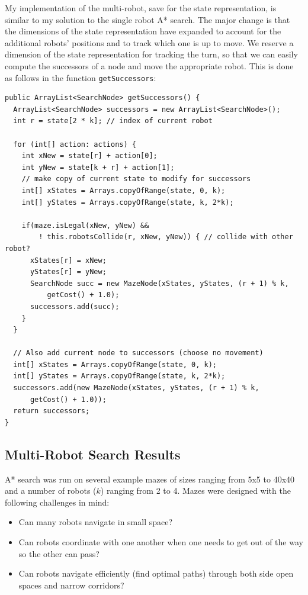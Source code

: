 \documentclass{article}
\begin{document}
My implementation of the multi-robot, save for the state representation, is similar to my solution to the single robot A* search. The major change is that the dimensions of the state representation have expanded to account for the additional robots' positions and to track which one is up to move. We reserve a dimension of the state representation for tracking the turn, so that we can easily compute the successors of a node and move the appropriate robot. This is done as follows in the function \verb`getSuccessors`:

\begin{lstlisting}
public ArrayList<SearchNode> getSuccessors() {
  ArrayList<SearchNode> successors = new ArrayList<SearchNode>();
  int r = state[2 * k]; // index of current robot
  
  for (int[] action: actions) {
    int xNew = state[r] + action[0];
    int yNew = state[k + r] + action[1];
    // make copy of current state to modify for successors
    int[] xStates = Arrays.copyOfRange(state, 0, k);
    int[] yStates = Arrays.copyOfRange(state, k, 2*k);
    
    if(maze.isLegal(xNew, yNew) && 
        ! this.robotsCollide(r, xNew, yNew)) { // collide with other robot?
      xStates[r] = xNew;
      yStates[r] = yNew;
      SearchNode succ = new MazeNode(xStates, yStates, (r + 1) % k,
          getCost() + 1.0);
      successors.add(succ);
    }  
  }
  
  // Also add current node to successors (choose no movement)
  int[] xStates = Arrays.copyOfRange(state, 0, k);
  int[] yStates = Arrays.copyOfRange(state, k, 2*k);
  successors.add(new MazeNode(xStates, yStates, (r + 1) % k, 
      getCost() + 1.0));
  return successors;
}
\end{lstlisting}

\subsection{Multi-Robot Search Results}

A* search was run on several example mazes of sizes ranging from 5x5 to 40x40 and a number of robots ($k$) ranging from 2 to 4. Mazes were designed with the following challenges in mind:

\begin{itemize}
  \item Can many robots navigate in small space?
  \item Can robots coordinate with one another when one needs to get out of the way so the other can pass?
  \item Can robots navigate efficiently (find optimal paths) through both side open spaces and narrow corridors?
\end{itemize}
\end{document}
